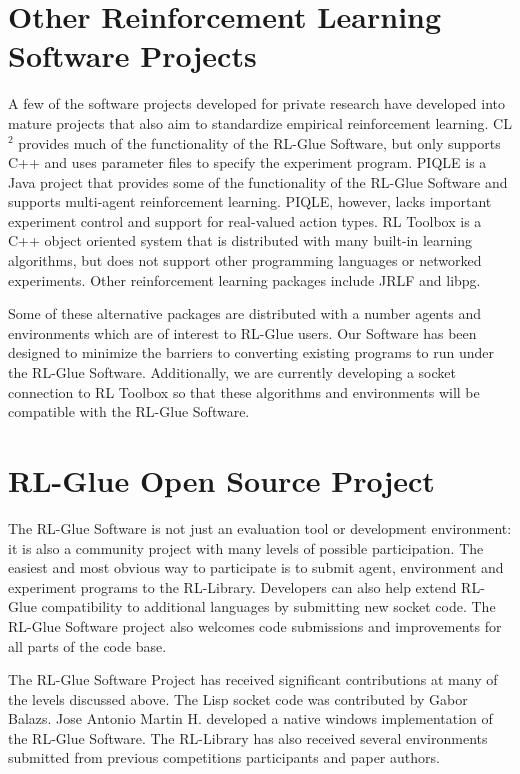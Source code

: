 \documentclass[twopage,11pt]{article}
\begin{document}
\section{Other Reinforcement Learning Software Projects}
A few of the software projects developed for private research have developed into mature projects that also aim to standardize empirical reinforcement learning. CL$^2$ provides much of the functionality of the RL-Glue Software, but only supports C++ and uses parameter files to specify the experiment program. PIQLE is a Java project that provides some of the functionality of the RL-Glue Software and supports multi-agent reinforcement learning. PIQLE, however, lacks important experiment control and support for real-valued action types. RL Toolbox is a C++ object oriented system that is distributed with many built-in learning algorithms, but does not support other programming languages or networked experiments. Other reinforcement learning packages include JRLF and libpg. 

Some of these alternative packages are distributed with a number agents and environments which are of interest to RL-Glue users. Our Software has been designed to minimize the barriers to converting existing programs to run under the RL-Glue Software. Additionally, we are currently developing a socket connection to RL Toolbox so that these algorithms and environments will be compatible with the RL-Glue Software. 






 
 
 
\section{RL-Glue Open Source Project}

The RL-Glue Software is not just an evaluation tool or development environment: it is also a community project with many levels of possible participation. The easiest and most obvious way to participate is to submit agent, environment and experiment programs to the RL-Library. Developers can also help extend RL-Glue compatibility to additional languages by submitting new socket code. The RL-Glue Software project also welcomes code submissions and improvements for all parts of the code base.   	

The RL-Glue Software Project has received significant contributions at many of the levels discussed above. The Lisp socket code was contributed by Gabor Balazs. Jose Antonio Martin H. developed a native windows implementation of the RL-Glue Software. The RL-Library has also received several environments submitted from previous competitions participants and paper authors. %
\end{document}
